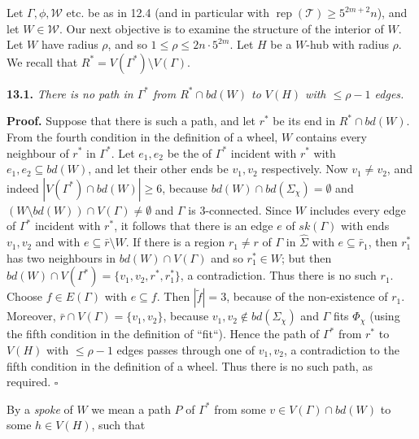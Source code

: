 
Let $\Gamma, \phi, \mathscr{W}$ etc. be as in 12.4 (and in particular with $\operatorname{rep}(\mathscr{T}) \ge 5^{2m+2}n$), and let $W \in \mathscr{W}$. Our next objective is to examine the structure of the interior of $W$. Let $W$ have radius $\rho$, and so $1 \le \rho \le 2n \cdot 5^{2m}$. Let $H$ be a $W$-hub with radius $\rho$. We recall that $R^* = V(\Gamma^*) \setminus V(\Gamma)$.

\textbf{13.1.} \textit{There is no path in $\Gamma^*$ from $R^* \cap bd(W)$ to $V(H)$ with $\le \rho - 1$ edges.}

\textbf{Proof.} Suppose that there is such a path, and let $r^*$ be its end in $R^* \cap bd(W)$. From the fourth condition in the definition of a wheel, $W$ contains every neighbour of $r^*$ in $\Gamma^*$. Let $e_1, e_2$ be the   of $\Gamma^*$ incident with $r^*$ with $e_1, e_2 \subseteq bd(W)$, and let their other ends be $v_1, v_2$ respectively. Now $v_1 \ne v_2$, and indeed $|V(\Gamma^*) \cap bd(W)| \ge 6$, because $bd(W) \cap bd(\Sigma_\chi) = \emptyset$ and $(W \setminus bd(W)) \cap V(\Gamma) \ne \emptyset$ and $\Gamma$ is 3-connected. Since $W$ includes every edge of $\Gamma^*$ incident with $r^*$, it follows that there is an edge $e$ of $sk(\Gamma)$ with ends $v_1, v_2$ and with $e \subseteq \bar{r} \setminus W$. If there is a region $r_1 \ne r$ of $\Gamma$ in $\hat{\Sigma}$ with $e \subseteq \bar{r}_1$, then $r_1^*$ has two neighbours in $bd(W) \cap V(\Gamma)$ and so $r_1^* \in W$; but then $bd(W) \cap V(\Gamma^*) = \{v_1, v_2, r^*, r_1^*\}$, a contradiction. Thus there is no such $r_1$. Choose $f \in E(\Gamma)$ with $e \subseteq f$. Then $|\tilde{f}| = 3$, because of the non-existence of $r_1$. Moreover, $\bar{r} \cap V(\Gamma) = \{v_1, v_2\}$, because $v_1, v_2 \notin bd(\Sigma_\chi)$ and $\Gamma$ fits $\Phi_\chi$ (using the fifth condition in the definition of ``fit``). Hence the path of $\Gamma^*$ from $r^*$ to $V(H)$ with $\le \rho - 1$ edges passes through one of $v_1, v_2$, a contradiction to the fifth condition in the definition of a wheel. Thus there is no such path, as required. $\square$

By a \textit{spoke} of $W$ we mean a path $P$ of $\Gamma^*$ from some $v \in V(\Gamma) \cap bd(W)$ to some $h \in V(H)$, such that

